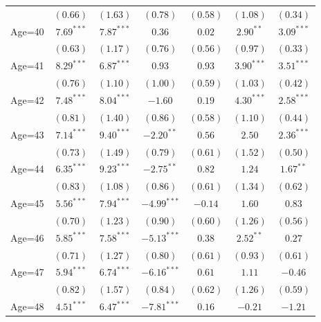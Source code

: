 \documentclass[fullpage]{paper}
\begin{document}
\begin{center}
\begin{longtable}{l c c c c c c }
            & $(0.66)$      & $(1.63)$      & $(0.78)$       & $(0.58)$      & $(1.08)$      & $(0.34)$      \\
Age=40      & $7.69^{***}$  & $7.87^{***}$  & $0.36$         & $0.02$        & $2.90^{**}$   & $3.09^{***}$  \\
            & $(0.63)$      & $(1.17)$      & $(0.76)$       & $(0.56)$      & $(0.97)$      & $(0.33)$      \\
Age=41      & $8.29^{***}$  & $6.87^{***}$  & $0.93$         & $0.93$        & $3.90^{***}$  & $3.51^{***}$  \\
            & $(0.76)$      & $(1.10)$      & $(1.00)$       & $(0.59)$      & $(1.03)$      & $(0.42)$      \\
Age=42      & $7.48^{***}$  & $8.04^{***}$  & $-1.60$        & $0.19$        & $4.30^{***}$  & $2.58^{***}$  \\
            & $(0.81)$      & $(1.40)$      & $(0.86)$       & $(0.58)$      & $(1.10)$      & $(0.44)$      \\
Age=43      & $7.14^{***}$  & $9.40^{***}$  & $-2.20^{**}$   & $0.56$        & $2.50$        & $2.36^{***}$  \\
            & $(0.73)$      & $(1.49)$      & $(0.79)$       & $(0.61)$      & $(1.52)$      & $(0.50)$      \\
Age=44      & $6.35^{***}$  & $9.23^{***}$  & $-2.75^{**}$   & $0.82$        & $1.24$        & $1.67^{**}$   \\
            & $(0.83)$      & $(1.08)$      & $(0.86)$       & $(0.61)$      & $(1.34)$      & $(0.62)$      \\
Age=45      & $5.56^{***}$  & $7.94^{***}$  & $-4.99^{***}$  & $-0.14$       & $1.60$        & $0.83$        \\
            & $(0.70)$      & $(1.23)$      & $(0.90)$       & $(0.60)$      & $(1.26)$      & $(0.56)$      \\
Age=46      & $5.85^{***}$  & $7.58^{***}$  & $-5.13^{***}$  & $0.38$        & $2.52^{**}$   & $0.27$        \\
            & $(0.71)$      & $(1.27)$      & $(0.80)$       & $(0.61)$      & $(0.93)$      & $(0.61)$      \\
Age=47      & $5.94^{***}$  & $6.74^{***}$  & $-6.16^{***}$  & $0.61$        & $1.11$        & $-0.46$       \\
            & $(0.82)$      & $(1.57)$      & $(0.84)$       & $(0.62)$      & $(1.26)$      & $(0.59)$      \\
Age=48      & $4.51^{***}$  & $6.47^{***}$  & $-7.81^{***}$  & $0.16$        & $-0.21$       & $-1.21$       \\

\end{longtable}
\end{center}
\end{document}
